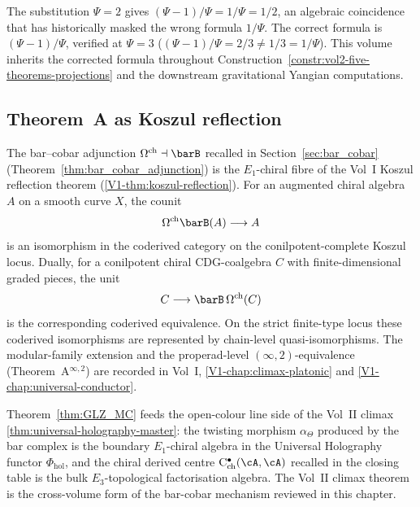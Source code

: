 \begin{remark}[Coincidence at $\Psi=2$ flagged]
\label{rem:bar-cobar-review-psi2-coincidence}
The substitution $\Psi=2$ gives $(\Psi-1)/\Psi = 1/\Psi = 1/2$, an
algebraic coincidence that has historically masked the wrong
formula $1/\Psi$. The correct formula is $(\Psi-1)/\Psi$, verified
at $\Psi=3$ ($(\Psi-1)/\Psi=2/3 \ne 1/3=1/\Psi$). This volume
inherits the corrected formula throughout
Construction~\ref{constr:vol2-five-theorems-projections} and the
downstream gravitational Yangian computations.
\end{remark}

\subsection{Theorem~A as Koszul reflection}
\label{subsec:bar-cobar-review-koszul-reflection-anchor}

\begin{remark}
\label{rem:bar-cobar-review-koszul-reflection}
The bar--cobar adjunction
$\Omega^{\mathrm{ch}} \dashv \barB$ recalled in
Section~\ref{sec:bar_cobar} (Theorem~\ref{thm:bar_cobar_adjunction})
is the $E_1$-chiral fibre of the Vol~I Koszul reflection theorem
(\cref{V1-thm:koszul-reflection}). For an augmented chiral algebra
$A$ on a smooth curve $X$, the counit
\[
\Omega^{\mathrm{ch}}\barB(A) \longrightarrow A
\]
is an isomorphism in the coderived category on the
conilpotent-complete Koszul locus. Dually, for a conilpotent chiral
$\mathrm{CDG}$-coalgebra $C$ with finite-dimensional graded pieces,
the unit
\[
C \longrightarrow \barB\,\Omega^{\mathrm{ch}}(C)
\]
is the corresponding coderived equivalence. On the strict
finite-type locus these coderived isomorphisms are represented by
chain-level quasi-isomorphisms. The modular-family extension and the
properad-level $(\infty,2)$-equivalence (Theorem~A$^{\infty,2}$)
are recorded in Vol~I, \cref{V1-chap:climax-platonic} and
\cref{V1-chap:universal-conductor}.
\end{remark}

\begin{remark}
\label{rem:bar-cobar-review-uhm-bridge}
Theorem~\ref{thm:GLZ_MC} feeds the open-colour line side of the
Vol~II climax \cref{thm:universal-holography-master}: the twisting
morphism $\alpha_\Theta$ produced by the bar complex is the
boundary $E_1$-chiral algebra in the Universal Holography
functor $\Phi_{\mathrm{hol}}$, and the chiral derived centre
$\mathrm{C}^\bullet_{\mathrm{ch}}(\cA,\cA)$ recalled in the closing
table is the bulk $E_3$-topological factorisation algebra.
The Vol~II climax theorem is the cross-volume form of the
bar-cobar mechanism reviewed in this chapter.
\end{remark}

